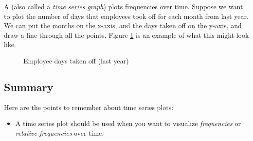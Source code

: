 \documentclass[../../../main.tex]{subfiles}
\begin{document}
A  (also called a \emph{time series graph}) plots frequencies over time. Suppose we want to plot the number of days that employees took off for each month from last year. We can put the months on the x-axis, and the days taken off on the y-axis, and draw a line through all the points. Figure \ref{plot:Employee days off time series plot} is an example of what this might look like.

\begin{figure}[ht]
  \caption{\label{plot:Employee days off time series plot} Employee days taken off (last year)}
\end{figure}


\subsection{Summary}

Here are the points to remember about time series plots:

\begin{itemize}

  \item A time series plot should be used when you want to visualize \emph{frequencies} or \emph{relative frequencies} over time.

\end{itemize}
\end{document}
